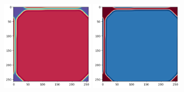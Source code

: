 \begin{center}
\includegraphics[height=4.5cm]{python_codes/fieldstone_171/results/sigma2_solution_final_u.png}
\includegraphics[height=4.5cm]{python_codes/fieldstone_171/results/sigma2_solution_final_v.png}
\end{center}









